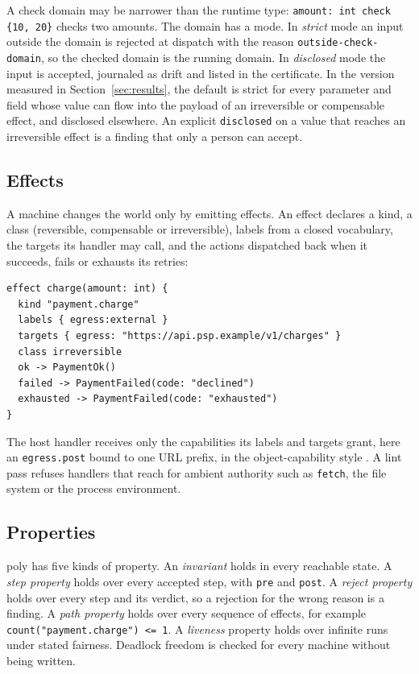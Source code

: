 \documentclass[11pt]{article}
\newcommand{\poly}{\textsf{poly}}
\begin{document}
A check domain may be narrower than the runtime type: \texttt{amount: int check \{10, 20\}} checks two amounts. The domain has a mode. In \emph{strict} mode an input outside the domain is rejected at dispatch with the reason \texttt{outside-check-domain}, so the checked domain is the running domain. In \emph{disclosed} mode the input is accepted, journaled as drift and listed in the certificate. In the version measured in Section~\ref{sec:results}, the default is strict for every parameter and field whose value can flow into the payload of an irreversible or compensable effect, and disclosed elsewhere. An explicit \texttt{disclosed} on a value that reaches an irreversible effect is a finding that only a person can accept.

\subsection{Effects}

A machine changes the world only by emitting effects. An effect declares a kind, a class (reversible, compensable or irreversible), labels from a closed vocabulary, the targets its handler may call, and the actions dispatched back when it succeeds, fails or exhausts its retries:

\begin{lstlisting}
effect charge(amount: int) {
  kind "payment.charge"
  labels { egress:external }
  targets { egress: "https://api.psp.example/v1/charges" }
  class irreversible
  ok -> PaymentOk()
  failed -> PaymentFailed(code: "declined")
  exhausted -> PaymentFailed(code: "exhausted")
}
\end{lstlisting}

The host handler receives only the capabilities its labels and targets grant, here an \texttt{egress.post} bound to one URL prefix, in the object-capability style \cite{miller2006robust}. A lint pass refuses handlers that reach for ambient authority such as \texttt{fetch}, the file system or the process environment.

\subsection{Properties}

\poly{} has five kinds of property. An \emph{invariant} holds in every reachable state. A \emph{step property} holds over every accepted step, with \texttt{pre} and \texttt{post}. A \emph{reject property} holds over every step and its verdict, so a rejection for the wrong reason is a finding. A \emph{path property} holds over every sequence of effects, for example \texttt{count("payment.charge") <= 1}. A \emph{liveness} property holds over infinite runs under stated fairness. Deadlock freedom is checked for every machine without being written.
\end{document}
